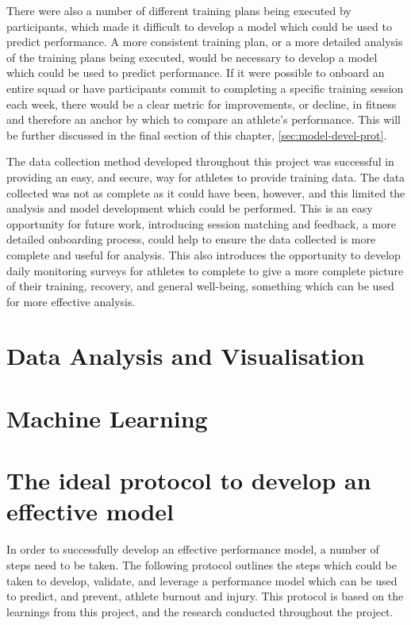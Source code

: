 There were also a number of different training plans being executed by participants, which made it difficult to develop a model which could be used to predict performance. A more consistent training plan, or a more detailed analysis of the training plans being executed, would be necessary to develop a model which could be used to predict performance. If it were possible to onboard an entire squad or have participants commit to completing a specific training session each week, there would be a clear metric for improvements, or decline, in fitness and therefore an anchor by which to compare an athlete's performance. This will be further discussed in the final section of this chapter, \autoref{sec:model-devel-prot}.

The data collection method developed throughout this project was successful in providing an easy, and secure, way for athletes to provide training data. The data collected was not as complete as it could have been, however, and this limited the analysis and model development which could be performed. This is an easy opportunity for future work, introducing session matching and feedback, a more detailed onboarding process, could help to ensure the data collected is more complete and useful for analysis. This also introduces the opportunity to develop daily monitoring surveys for athletes to complete to give a more complete picture of their training, recovery, and general well-being, something which can be used for more effective analysis.

\section{Data Analysis and Visualisation}
\section{Machine Learning}
\section{\label{sec:model-devel-prot}The ideal protocol to develop an effective model}
In order to successfully develop an effective performance model, a number of steps need to be taken. The following protocol outlines the steps which could be taken to develop, validate, and leverage a performance model which can be used to predict, and prevent, athlete burnout and injury. This protocol is based on the learnings from this project, and the research conducted throughout the project.

